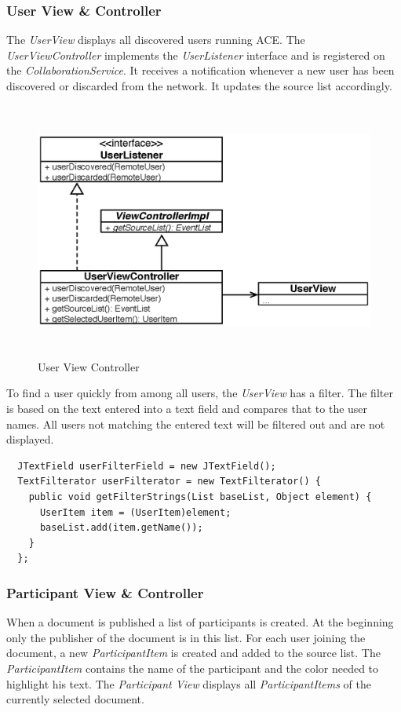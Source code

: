 \subsubsection{User View \& Controller}
The \textit{User\-View} displays all discovered users running ACE. The \textit{User\-View\-Controller} implements the \textit{User\-Listener} interface and is registered on the \textit{Collaboration\-Service}. It receives a notification whenever a new user has been discovered or discarded from the network. It updates the source list accordingly. 

\begin{figure}[H]
\begin{center}
  \includegraphics[height=3.33in, width=5.62in]{../images/finalreport/application_userview.eps}
\caption{User View Controller}
\label{application_userview}
\end{center}
\end{figure}

To find a user quickly from among all users, the \textit{User\-View} has a filter. The filter is based on the text entered into a text field and compares that to the user names. All users not matching the entered text will be filtered out and are not displayed.

\begin{verbatim}
  JTextField userFilterField = new JTextField();
  TextFilterator userFilterator = new TextFilterator() {
    public void getFilterStrings(List baseList, Object element) {
      UserItem item = (UserItem)element;
      baseList.add(item.getName());
    }
  };
\end{verbatim}

\subsubsection{Participant View \& Controller}
When a document is published a list of participants is created. At the beginning only the publisher of the document is in this list. For each user joining the document, a new \textit{Participant\-Item} is created and added to the source list. The \textit{Participant\-Item} contains the name of the participant and the color needed to highlight his text. The \textit{Participant View} displays all \textit{Participant\-Items} of the currently selected document.

